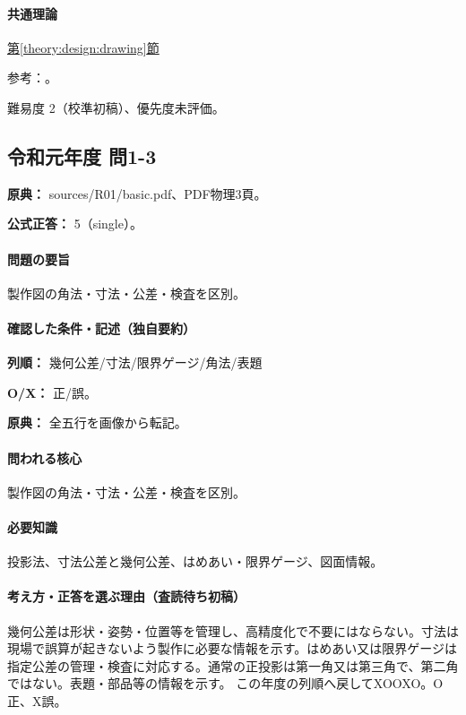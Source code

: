 \paragraph{共通理論} \hyperref[theory:design:drawing]{第\ref*{theory:design:drawing}節}

\par 参考：\cite{design48_iso}。

\par 難易度 2（校準初稿）、優先度未評価。

\subsection{令和元年度 問1-3}
\label{q:r01-reg-basic-1-3}

\noindent\textbf{原典：} sources/R01/basic.pdf、PDF物理3頁。

\textbf{公式正答：} 5（single）。

\paragraph{問題の要旨} 製作図の角法・寸法・公差・検査を区別。

\paragraph{確認した条件・記述（独自要約）}\mbox{}\par

\noindent\textbf{列順：} 幾何公差/寸法/限界ゲージ/角法/表題\par

\noindent\textbf{O/X：} 正/誤。\par

\noindent\textbf{原典：} 全五行を画像から転記。\par

\paragraph{問われる核心} 製作図の角法・寸法・公差・検査を区別。

\paragraph{必要知識} 投影法、寸法公差と幾何公差、はめあい・限界ゲージ、図面情報。

\paragraph{考え方・正答を選ぶ理由（査読待ち初稿）} 幾何公差は形状・姿勢・位置等を管理し、高精度化で不要にはならない。寸法は現場で誤算が起きないよう製作に必要な情報を示す。はめあい又は限界ゲージは指定公差の管理・検査に対応する。通常の正投影は第一角又は第三角で、第二角ではない。表題・部品等の情報を示す。 この年度の列順へ戻してXOOXO。O正、X誤。

